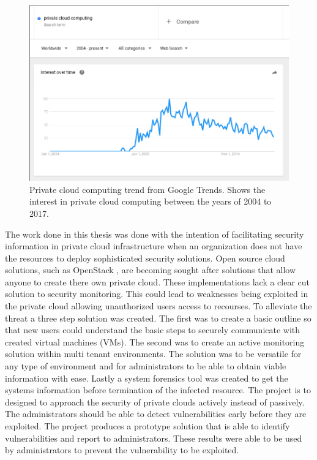 \documentclass[12pt]{article}
\begin{document}
\begin{figure}[ht]
    \centering
    \includegraphics[scale=.3]{./pic/2017-06-14-135222_914x619_scrot.png}
    \caption{Private cloud computing trend from Google Trends. Shows the interest in private cloud computing between the years of 2004 to 2017. \cite{GoogleTrendsPriv}}
    \label{fig:PrivCloudTrendGoogle}
\end{figure}

The work done in this thesis was done with the intention of facilitating security information in private cloud infrastructure when an organization does not have the resources to deploy sophisticated security solutions. Open source cloud solutions, such as OpenStack \cite{Openstack}, are becoming sought after solutions that allow anyone to create there own private cloud. These implementations lack a clear cut solution to security monitoring. This could lead to weaknesses being exploited in the private cloud allowing unauthorized users access to recourses. To alleviate the threat a three step solution was created. The first was to create a basic outline so that new users could understand the basic steps to securely communicate with created virtual machines (VMs). The second was to create an active monitoring solution within multi tenant environments. The solution was to be versatile for any type of environment and for administrators to be able to obtain viable information with ease. Lastly a system forensics tool was created to get the systems information before termination of the infected resource. The project is to designed to approach the security of private clouds actively instead of passively. The administrators should be able to detect vulnerabilities early before they are exploited. The project produces a prototype solution that is able to identify vulnerabilities and report to administrators. These results were able to be used by administrators to prevent the vulnerability to be exploited.  
\end{document}
